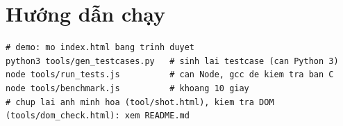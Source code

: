 \documentclass[12pt,a4paper]{article}
\begin{document}
\section{Hướng dẫn chạy}
\begin{lstlisting}
# demo: mo index.html bang trinh duyet
python3 tools/gen_testcases.py   # sinh lai testcase (can Python 3)
node tools/run_tests.js          # can Node, gcc de kiem tra ban C
node tools/benchmark.js          # khoang 10 giay
# chup lai anh minh hoa (tool/shot.html), kiem tra DOM (tools/dom_check.html): xem README.md
\end{lstlisting}
\end{document}
